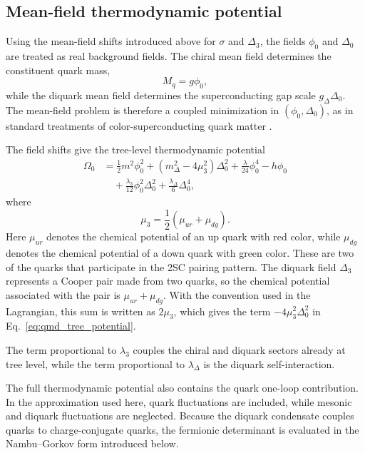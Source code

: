 \subsection*{Mean-field thermodynamic potential}

Using the mean-field shifts introduced above for \(\sigma\) and
\(\Delta_3\), the fields \(\phi_0\) and \(\Delta_0\) are treated as real
background fields. The chiral mean field determines the constituent quark
mass,
\begin{equation}
M_q = g\phi_0 ,
\end{equation}
while the diquark mean field determines the superconducting gap scale
\(g_\Delta\Delta_0\). The mean-field problem is therefore a coupled
minimization in \((\phi_0,\Delta_0)\), as in standard treatments of
color-superconducting quark matter \cite{Shovkovy2005,Andersen2024}.

The field shifts give the tree-level thermodynamic potential
\begin{align}
\Omega_0
&=
\frac{1}{2}m^2\phi_0^2
+
\left(m_\Delta^2-4\mu_3^2\right)\Delta_0^2
+
\frac{\lambda}{24}\phi_0^4
-
h\phi_0
\nonumber \\
&\quad
+
\frac{\lambda_3}{12}\phi_0^2\Delta_0^2
+
\frac{\lambda_\Delta}{6}\Delta_0^4 ,
\label{eq:qmd_tree_potential}
\end{align}
where
\begin{equation}
\mu_3=\frac{1}{2}\left(\mu_{ur}+\mu_{dg}\right).
\end{equation}
Here \(\mu_{ur}\) denotes the chemical potential of an up quark with red
color, while \(\mu_{dg}\) denotes the chemical potential of a down quark
with green color. These are two of the quarks that participate in the 2SC
pairing pattern. The diquark field \(\Delta_3\) represents a Cooper pair
made from two quarks, so the chemical potential associated with the pair is
\(\mu_{ur}+\mu_{dg}\). With the convention used in the Lagrangian, this
sum is written as \(2\mu_3\), which gives the term
\(-4\mu_3^2\Delta_0^2\) in Eq.~\eqref{eq:qmd_tree_potential}.

The term proportional to \(\lambda_3\) couples the chiral and diquark
sectors already at tree level, while the term proportional to
\(\lambda_\Delta\) is the diquark self-interaction.

The full thermodynamic potential also contains the quark one-loop
contribution. In the approximation used here, quark fluctuations are
included, while mesonic and diquark fluctuations are neglected. Because the
diquark condensate couples quarks to charge-conjugate quarks, the
fermionic determinant is evaluated in the Nambu--Gorkov form introduced
below.

